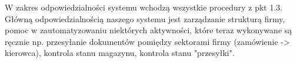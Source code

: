 

W zakres odpowiedzialności systemu wchodzą wszystkie procedury z pkt 1.3.
Główną odpowiedzialnością naszego systemu jest zarządzanie strukturą firmy, pomoc 
w zautomatyzowaniu niektórych aktywności, które teraz wykonywane są ręcznie np. przesyłanie dokumentów 
pomiędzy sektorami firmy (zamówienie -> kierowca), kontrola stanu magazynu, kontrola stanu "przesyłki".
